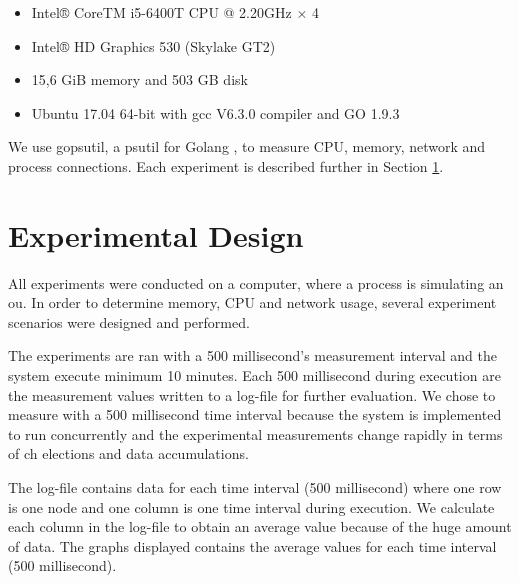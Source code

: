 \documentclass[USenglish]{uit-thesis}
\begin{document}
\begin{itemize} 
\item Intel® CoreTM i5-6400T CPU @ 2.20GHz × 4
\item Intel® HD Graphics 530 (Skylake GT2)
\item 15,6 GiB memory and 503 GB disk
\item Ubuntu 17.04 64-bit with gcc V6.3.0 compiler and GO 1.9.3
\end{itemize}


We use gopsutil, a psutil for Golang \cite{golangPsutil}, to measure CPU, memory, network and process connections. Each experiment is described further in Section \ref{eva:exp_des}.

\section{Experimental Design} \label{eva:exp_des}

All experiments were conducted on a computer, where a process is simulating an \gls{ou}. In order to determine memory, CPU and network usage, several experiment scenarios were designed and performed.

The experiments are ran with a 500 millisecond's measurement interval and the system execute minimum 10 minutes. Each 500 millisecond during execution are the measurement values written to a log-file for further evaluation. We chose to measure with a 500 millisecond time interval because the system is implemented to run concurrently and the experimental measurements change rapidly in terms of \gls{ch} elections and data accumulations. 

The log-file contains data for each time interval (500 millisecond) where  one row is one node and one column is one time interval during execution. We calculate each column in the log-file to obtain an average value because of the huge amount of data. The graphs displayed contains the average values for each time interval (500 millisecond).
\end{document}
